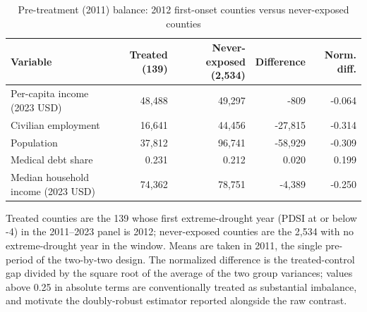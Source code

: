 \begin{table}[htbp]
\centering
\footnotesize
\setlength{\tabcolsep}{4pt}
\sloppy
\caption{Pre-treatment (2011) balance: 2012 first-onset counties versus never-exposed counties}
\label{tab:e1t2}
\begin{tabularx}{\textwidth}{>{\raggedright\arraybackslash}X r r r r}
\toprule
Variable & Treated (139) & Never-exposed (2,534) & Difference & Norm. diff. \\
\midrule
Per-capita income (2023 USD) & 48,488 & 49,297 & -809 & -0.064 \\
Civilian employment & 16,641 & 44,456 & -27,815 & -0.314 \\
Population & 37,812 & 96,741 & -58,929 & -0.309 \\
Medical debt share & 0.231 & 0.212 & 0.020 & 0.199 \\
Median household income (2023 USD) & 74,362 & 78,751 & -4,389 & -0.250 \\
\bottomrule
\end{tabularx}
\begin{minipage}{\textwidth}\vspace{0.5em}\footnotesize
Treated counties are the 139 whose first extreme-drought year (PDSI at or below -4) in the 2011--2023 panel is 2012; never-exposed counties are the 2,534 with no extreme-drought year in the window. Means are taken in 2011, the single pre-period of the two-by-two design. The normalized difference is the treated-control gap divided by the square root of the average of the two group variances; values above 0.25 in absolute terms are conventionally treated as substantial imbalance, and motivate the doubly-robust estimator reported alongside the raw contrast.
\end{minipage}
\end{table}
